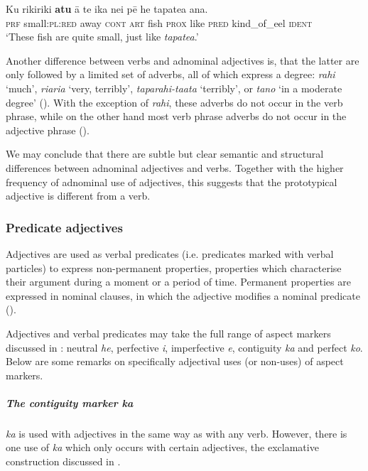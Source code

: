 \ea\label{ex:3.98}
\gll Ku rikiriki \textbf{atu} {\ꞌ}ā te ika nei pē he tapatea {\ꞌ}ana.\\
\textsc{prf} small:\textsc{pl}:\textsc{red} away \textsc{cont} \textsc{art} fish \textsc{prox} like \textsc{pred} kind\_of\_eel \textsc{ident}\\

\glt
‘These fish are quite small, just like \textit{tapatea}.’ \textstyleExampleref{[R364.015]} 
\z

Another difference between verbs and adnominal adjectives is, that the latter are only followed by a limited set of adverbs, all of which express a degree: \textit{rahi} ‘much’, \textit{ri{\ꞌ}ari{\ꞌ}a} ‘very, terribly’, \textit{taparahi-ta{\ꞌ}ata} ‘terribly’, or \textit{tano} ‘in a moderate degree’ (). With the exception of \textit{rahi}, these adverbs do not occur in the verb phrase, while on the other hand most verb phrase adverbs do not occur in the adjective phrase ().

We may conclude that there are subtle but clear semantic and structural differences between adnominal adjectives and verbs. Together with the higher frequency of adnominal use of adjectives, this suggests that the prototypical adjective is different from a verb.

\subsubsection[Predicate adjectives]{Predicate adjectives}\label{sec:3.5.1.5}

Adjectives are used as verbal predicates (i.e. predicates marked with verbal particles) to express non-permanent properties, properties which characterise their argument during a moment or a period of time. Permanent properties are expressed in nominal clauses, in which the adjective modifies a nominal predicate ().

Adjectives and verbal predicates may take the full range of aspect markers discussed in : neutral \textit{he}, perfective \textit{i}, imperfective \textit{e}, contiguity \textit{ka} and perfect \textit{ko}. Below are some remarks on specifically adjectival uses (or non-uses) of aspect markers.

\subparagraph{The contiguity marker \textit{ka}} \textit{ka} is used with adjectives in the same way as with any verb. However, there is one use of \textit{ka} which only occurs with certain adjectives, the exclamative construction discussed in .

